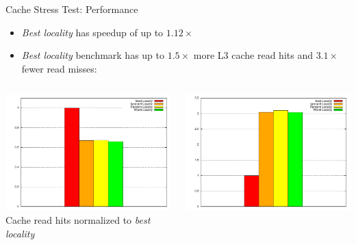 \begin{frame}{Cache Stress Test: Performance}
  \begin{itemize}
  \item \emph{Best locality} has speedup of up to $1.12\times$
  \item \emph{Best locality} benchmark has up to $1.5\times$ more L3
    cache read hits and $3.1\times$ fewer read misses:
  \end{itemize}


  \begin{columns}[c]
    \begin{column}{0.5\textwidth}
      \begin{center}
        \includegraphics[width=\textwidth]{figures/cache-stress-test-cache-hits} \\
        \tiny{Cache read hits normalized to \emph{best locality}}
      \end{center}
    \end{column}
    \begin{column}{0.5\textwidth}
      \begin{center}
        \includegraphics[width=\textwidth]{figures/cache-stress-test-cache-misses} \\

\end{center}
\end{column}
\end{columns}
\end{frame}
